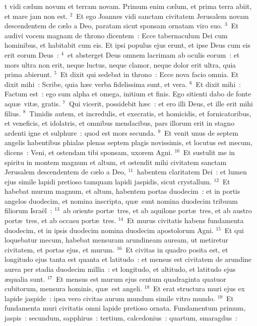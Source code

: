\bchapter
{}t vidi c\ae lum novum et terram novam. Primum enim c\ae lum, et prima terra abiit, et mare jam non est.
${}^{2}$~Et ego Joannes vidi sanctam civitatem Jerusalem novam descendentem de c\ae lo a Deo, paratam sicut sponsam ornatam viro suo.
${}^{3}$~Et audivi vocem magnam de throno dicentem~: Ecce tabernaculum Dei cum hominibus, et habitabit cum eis. Et ipsi populus ejus erunt, et ipse Deus cum eis erit eorum Deus~:
${}^{4}$~et absterget Deus omnem lacrimam ab oculis eorum~: et mors ultra non erit, neque luctus, neque clamor, neque dolor erit ultra, quia prima abierunt.
${}^{5}$~Et dixit qui sedebat in throno~: Ecce nova facio omnia. Et dixit mihi~: Scribe, quia h\ae c verba fidelissima sunt, et vera.
${}^{6}$~Et dixit mihi~: Factum est~: ego sum alpha et omega, initium et finis. Ego sitienti dabo de fonte aqu\ae\ vit\ae , gratis.
${}^{7}$~Qui vicerit, possidebit h\ae c~: et ero illi Deus, et ille erit mihi filius.
${}^{8}$~Timidis autem, et incredulis, et execratis, et homicidis, et fornicatoribus, et veneficis, et idolatris, et omnibus mendacibus, pars illorum erit in stagno ardenti igne et sulphure~: quod est mors secunda.
${}^{9}$~Et venit unus de septem angelis habentibus phialas plenas septem plagis novissimis, et locutus est mecum, dicens~: Veni, et ostendam tibi sponsam, uxorem Agni.
${}^{10}$~Et sustulit me in spiritu in montem magnum et altum, et ostendit mihi civitatem sanctam Jerusalem descendentem de c\ae lo a Deo,
${}^{11}$~habentem claritatem Dei~: et lumen ejus simile lapidi pretioso tamquam lapidi jaspidis, sicut crystallum.
${}^{12}$~Et habebat murum magnum, et altum, habentem portas duodecim~: et in portis angelos duodecim, et nomina inscripta, qu\ae\ sunt nomina duodecim tribuum filiorum Isra\"el~:
${}^{13}$~ab oriente port\ae\ tres, et ab aquilone port\ae\ tres, et ab austro port\ae\ tres, et ab occasu port\ae\ tres.
${}^{14}$~Et murus civitatis habens fundamenta duodecim, et in ipsis duodecim nomina duodecim apostolorum Agni.
${}^{15}$~Et qui loquebatur mecum, habebat mensuram arundineam auream, ut metiretur civitatem, et portas ejus, et murum.
${}^{16}$~Et civitas in quadro posita est, et longitudo ejus tanta est quanta et latitudo~: et mensus est civitatem de arundine aurea per stadia duodecim millia~: et longitudo, et altitudo, et latitudo ejus \ae qualia sunt.
${}^{17}$~Et mensus est murum ejus centum quadraginta quatuor cubitorum, mensura hominis, qu\ae\ est angeli.
${}^{18}$~Et erat structura muri ejus ex lapide jaspide~: ipsa vero civitas aurum mundum simile vitro mundo.
${}^{19}$~Et fundamenta muri civitatis omni lapide pretioso ornata. Fundamentum primum, jaspis~: secundum, sapphirus~: tertium, calcedonius~: quartum, smaragdus~:
